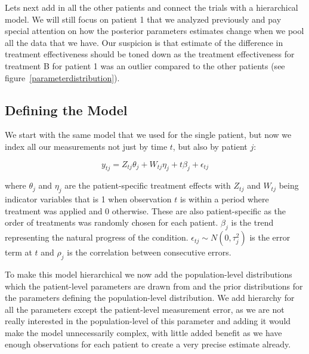 \documentclass[12pt,a4paper,leqno]{report}
\theoremstyle{plain}
\theoremstyle{definition}
\theoremstyle{remark}
\begin{document}
Lets next add in all the other patients and connect the trials with a hierarchical
model. We will still focus on patient 1 that we analyzed previously and pay special
attention on how the posterior parameters estimates change when we pool all the data
that we have. Our suspicion is that estimate of the difference in treatment effectiveness
should be toned down as the treatment effectiveness for treatment B for patient 1 was an
outlier compared to the other patients (see figure\ \ref{parameterdistribution}).


\subsection{Defining the Model}\label{hiermodel}

We start with the same model that we used for the single patient, but now we index all our
measurements not just by time \(t\), but also by patient \(j\):

\begin{def}\label{hierarchicalmodel}
    \begin{equation}\label{}
        y_{tj} = Z_{tj}\theta_{j} + W_{tj}\eta_{j} + t\beta_{j} + \epsilon_{tj}
    \end{equation}
\end{def} where \(\theta_{j} \) and \(\eta_{j} \) are the patient-specific treatment effects with \(Z_{tj}\) and \(W_{tj}\) being indicator
variables that is 1 when observation \(t\) is within a period where treatment was applied and
0 otherwise. These are also patient-specific as the order of treatments was randomly
chosen for each patient. \(\beta_j\) is the trend representing the natural progress of the
condition. \(\epsilon_{tj} \sim N(0,\tau_j^2) \) is the error term at \(t\) and
\(\rho_j\) is the correlation between consecutive errors.

To make this model hierarchical we now add the population-level distributions which
the patient-level parameters are drawn from and the prior distributions for the
parameters defining the population-level distribution. We add hierarchy for all the
parameters except the patient-level measurement error, as
we are not really interested in the population-level of this parameter and adding it
would make the model unnecessarily complex, with little added benefit as we have
enough observations for each patient to create a very precise estimate already.

\end{document}
